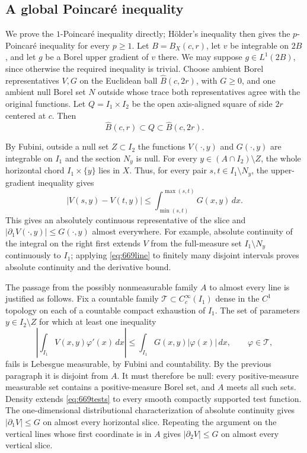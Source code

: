 \documentclass[11pt,a4paper]{article}
\theoremstyle{remark}
\begin{document}
\subsection{A global Poincar\'e inequality}

We prove the $1$-Poincar\'e inequality directly; H\"older's inequality
then gives the $p$-Poincar\'e inequality for every $p\ge1$.
Let $B=B_X(c,r)$, let $v$ be integrable on $2B$, and let $g$ be a Borel
upper gradient of $v$ there.  We may suppose $g\in L^1(2B)$, since
otherwise the required inequality is trivial.  Choose ambient Borel
representatives $V,G$ on the Euclidean ball $\widehat B(c,2r)$, with
$G\ge0$, and one ambient null Borel set $N$ outside whose trace both
representatives agree with the original functions.  Let
$Q=I_1\times I_2$ be the open axis-aligned square of side $2r$ centered
at $c$.  Then
\[
 \widehat B(c,r)\subset Q\subset\widehat B(c,2r).
\]

By Fubini, outside a null set $Z\subset I_2$ the functions
$V(\cdot,y)$ and $G(\cdot,y)$ are integrable on $I_1$ and the section
$N_y$ is null.  For every $y\in(A\cap I_2)\setminus Z$, the whole
horizontal chord $I_1\times\{y\}$ lies in $X$.  Thus, for every pair
$s,t\in I_1\setminus N_y$, the upper-gradient inequality gives
\begin{equation}
 |V(s,y)-V(t,y)|
       \le\int_{\min(s,t)}^{\max(s,t)}G(x,y)\,dx.
 \label{eq:669line}
\end{equation}
This gives an absolutely continuous representative of the slice and
$|\partial_1V(\cdot,y)|\le G(\cdot,y)$ almost everywhere.  For example,
absolute continuity of the integral on the right first extends $V$ from
the full-measure set $I_1\setminus N_y$ continuously to $I_1$; applying
\eqref{eq:669line} to finitely many disjoint intervals proves absolute
continuity and the derivative bound.

The passage from the possibly nonmeasurable family $A$ to almost every
line is justified as follows.  Fix a countable family
$\mathcal T\subset C_c^\infty(I_1)$ dense in the $C^1$ topology on each
of a countable compact exhaustion of $I_1$.  The set of parameters
$y\in I_2\setminus Z$ for which at least one inequality
\begin{equation}
 \left|\int_{I_1}V(x,y)\varphi'(x)\,dx\right|
       \le\int_{I_1}G(x,y)|\varphi(x)|\,dx,
       \qquad \varphi\in\mathcal T,
 \label{eq:669tests}
\end{equation}
fails is Lebesgue measurable, by Fubini and countability.  By the previous
paragraph it is disjoint from $A$.  It must therefore be null: every
positive-measure measurable set contains a positive-measure Borel set,
and $A$ meets all such sets.  Density extends
\eqref{eq:669tests} to every smooth compactly supported test function.
The one-dimensional distributional characterization of absolute
continuity gives $|\partial_1V|\le G$ on almost every horizontal slice.
Repeating the argument on the vertical lines whose first coordinate is
in $A$ gives $|\partial_2V|\le G$ on almost every vertical slice.
\end{document}
